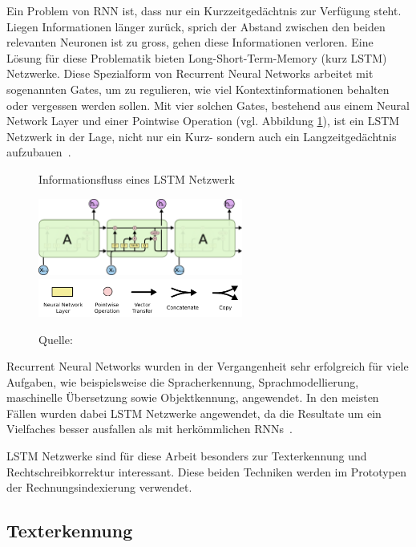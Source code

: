Ein Problem von RNN ist, dass nur ein Kurzzeitgedächtnis zur Verfügung steht. Liegen Informationen länger zurück, sprich der Abstand zwischen den beiden relevanten Neuronen ist zu gross, gehen diese Informationen verloren. Eine Lösung für diese Problematik bieten Long-Short-Term-Memory (kurz LSTM) Netzwerke. Diese Spezialform von Recurrent Neural Networks arbeitet mit sogenannten Gates, um zu regulieren, wie viel Kontextinformationen behalten oder vergessen werden sollen. Mit vier solchen Gates, bestehend aus einem Neural Network Layer und einer Pointwise Operation (vgl. Abbildung \ref{lstm1}), ist ein LSTM Netzwerk in der Lage, nicht nur ein Kurz- sondern auch ein Langzeitgedächtnis aufzubauen~\autocite{Olah2015}.
\begin{figure}[h!]
    \captionsetup{width=.9\linewidth}
    \caption{Informationsfluss eines LSTM Netzwerk}
    \label{lstm1}
    \centering
    \includegraphics[width=0.6\textwidth]{graphics/lstm.png}\\
    \vspace{0.5cm}
    \includegraphics[width=0.6\textwidth]{graphics/lstm-notation.png}\\
    \vspace{0.1cm}
    \caption*{Quelle: \textcite{Olah2015}}
\end{figure}

Recurrent Neural Networks wurden in der Vergangenheit sehr erfolgreich für viele Aufgaben, wie beispielsweise die Spracherkennung, Sprachmodellierung, maschinelle Übersetzung sowie Objektkennung, angewendet. In den meisten Fällen wurden dabei LSTM Netzwerke angewendet, da die Resultate um ein Vielfaches besser ausfallen als mit herkömmlichen RNNs~\autocite{Olah2015}.

LSTM Netzwerke sind für diese Arbeit besonders zur Texterkennung und Rechtschreibkorrektur interessant. Diese beiden Techniken werden im Prototypen der Rechnungsindexierung verwendet.

\subsection{Texterkennung}

